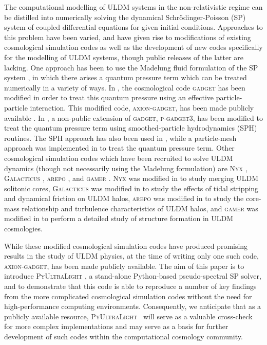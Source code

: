 \documentclass[a4paper,11pt]{article}
\newcommand{\PyUltraLight}{\textsc{PyUltraLight }}
\begin{document}
The computational modelling of ULDM systems in the non-relativistic regime can be distilled into numerically solving the dynamical Schr{\"o}dinger-Poisson (SP) system of coupled differential equations for given initial conditions. Approaches to this problem have been varied, and have given rise to modifications of existing cosmological simulation codes as well as the development of new codes specifically for the modelling of ULDM systems, though public releases of the latter are  lacking. One approach has been to use the Madelung fluid formulation of the SP system \cite{Madelung1926}, in which there arises a quantum pressure term which can be treated numerically in a variety of ways. In \cite{Zhang2018}, the cosmological code \textsc{gadget} \cite{Springel2005} has been modified in order to treat this quantum pressure using an effective particle-particle interaction. This modified code, \textsc{axion-gadget}, has been made publicly available \cite{axion-gadget}. In \cite{Nori2018}, a non-public extension of \textsc{gadget}, \textsc{p-gadget3}, has been modified to treat the quantum pressure term using smoothed-particle hydrodynamics (SPH) routines. The SPH approach has also been used in \cite{Mocz2015}, while a particle-mesh approach was implemented in \cite{Veltmaat2016} to treat the quantum pressure term. Other cosmological simulation codes which have been recruited to solve ULDM dynamics (though not necessarily using the Madelung formulation) are N\textsc{yx} \cite{Almgren2013}, G\textsc{alacticus} \cite{Benson2012}, \textsc{arepo} \cite{Springel2010}, and \textsc{gamer} \cite{Schive2010, gamer}. N\textsc{yx} was modified in \cite{Schwabe2016} to study merging ULDM solitonic cores, G\textsc{alacticus} was modified in \cite{Du2017} to study the effects of tidal stripping and dynamical friction on ULDM halos, \textsc{arepo} was modified in \cite{Mocz2017} to study the core-mass relationship and turbulence characteristics of ULDM halos, and \textsc{gamer} was modified in \cite{Schive2014_b} to perform a detailed study of structure formation in ULDM cosmologies. 

While these modified cosmological simulation codes have produced promising results in the study of ULDM physics, at the time of writing only one such code, \textsc{axion-gadget}, has been made publicly available. The aim of this paper is to introduce \PyUltraLight, a stand-alone Python-based pseudo-spectral SP solver, and to demonstrate that this code is able to reproduce a number of key findings from the more complicated cosmological simulation codes without the need for high-performance computing environments. Consequently, we anticipate that as a publicly available resource, \PyUltraLight\ will serve as a valuable cross-check for more complex implementations and may serve as a basis for further development of such codes within the computational cosmology community.   
\end{document}
